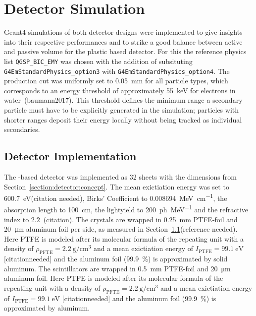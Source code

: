 \section{Detector Simulation}
Geant4 simulations of both detector designs were implemented to give insights into their respective performances and to strike a good balance between active and passive volume for the plastic based detector.
For this the reference physics list \texttt{QGSP\_BIC\_EMY} was chosen with the addition of subsituting \texttt{G4EmStandardPhysics\_option3} with \texttt{G4EmStandardPhysics\_option4}.
The production cut was uniformly set to \SI{0.05}{\milli\meter} for all particle types, which corresponds to an energy threshold of approximately \SI{55}{\kilo\electronvolt} for electrons in water~\cite{}(baumann2017). This threshold defines the minimum range a secondary particle must have to be explicitly generated in the simulation; particles with shorter ranges deposit their energy locally without being tracked as individual secondaries.

\subsection{Detector Implementation}
The -based detector was implemented as 32  sheets with the dimensions from Section~\ref{section:detector:concept}.
The mean exictiation energy was set to \SI{600.7}{\electronvolt}(citation needed), Birks' Coefficient to \SI{0.008694}{\mega\electronvolt\per\centi\meter}, the absorption length to \SI{100}{\centi\meter}, the lightyield to \SI{200}{ph\per\mega\electronvolt} and the refractive index to $2.2$~(citation). 
The crystals are wrapped in \SI{0.25}{\mm} PTFE-foil and \SI{20}{\um} aluminum foil per side, as measured in Section~\ref{}(reference needed).
Here PTFE is modeled after its molecular formula of the repeating unit  with a density of $\rho_{\text{PFTE}}=\SI{2.2}{\gram\per\cm\cubed}$ and a mean exictiation energy of $I_{\text{PTFE}} = \SI{99.1}{\electronvolt}$  [citationneeded] and the aluminum foil (\SI{99.9}{\percent}) is approximated by solid aluminum. 
The scintillators are wrapped in \SI{0.5}{\mm} PTFE-foil and \SI{20}{\um} aluminum foil.
Here PTFE is modeled after its molecular formula of the repeating unit  with a density of $\rho_{\text{PFTE}}=\SI{2.2}{\gram\per\cm\cubed}$ and a mean exictiation energy of $I_{\text{PTFE}} = \SI{99.1}{\electronvolt}$  [citationneeded] and the aluminum foil (\SI{99.9}{\percent}) is approximated by aluminum. 


